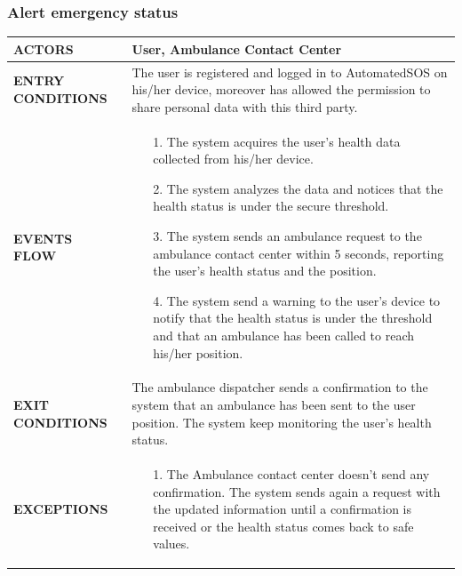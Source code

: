 \documentclass[a4paper]{article}
\begin{document}
\subsubsection{Alert emergency status}
\begin{center}
    \begin{tabular}{l || p{8cm} ||}
        \bf{ACTORS} & User, Ambulance Contact Center \\ \hline
        \bf{ENTRY CONDITIONS} & The user is registered and logged in to AutomatedSOS on his/her device, moreover has allowed the permission to share personal data with this third party. \\ \hline
        \bf{EVENTS FLOW} & \begin{itemize}[noitemsep, topsep=0cm, leftmargin=*] \vspace{-0.2cm}
            \item[1.] The system acquires the user's health data collected from his/her device.
            \item[2.] The system analyzes the data and notices that the health status is under the secure threshold.
            \item[3.] The system sends an ambulance request to the ambulance contact center within 5 seconds, reporting the user's health status and the position.
            \item[4.] The system send a warning to the user's device to notify that the health status is under the threshold and that an ambulance has been called to reach his/her position.
        \end{itemize}
        \\ \hline
        \bf{EXIT CONDITIONS} & The ambulance dispatcher sends a confirmation to the system that an ambulance has been sent to the user position. The system keep monitoring the user's health status.  \\ \hline
        \bf{EXCEPTIONS} & \begin{itemize}[noitemsep, topsep=0cm, leftmargin=*] \vspace{-0.2cm}
            \item[1.] The Ambulance contact center doesn't send any confirmation. The system sends again a request with the updated information until a confirmation is received or the health status comes back to safe values.
        \end{itemize}
        \\ \hline \hline
    \end{tabular}
\end{center}
\end{document}
